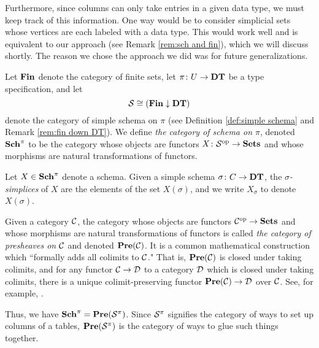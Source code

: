 \documentclass{amsart}
\def\DT{{\bf DT}}
\def\Sch{{\bf Sch}}
\def\Fin{{\bf Fin}}
\begin{document}
Furthermore, since columns can only take entries in a given data type, we must keep track of this information.  One way would be to consider simplicial sets whose vertices are each labeled with a data type.  This would work well and is equivalent to our approach (see Remark \ref{rem:sch and fin}), which we will discuss shortly.  The reason we chose the approach we did was for future generalizations.

\begin{definition}\label{def:schema}

Let $\Fin$ denote the category of finite sets, let $\pi\taking U\to\DT$ be a type specification, and let $$\mcS\iso(\Fin\down\DT)$$ denote the category of simple schema on $\pi$ (see Definition \ref{def:simple schema} and Remark \ref{rem:fin down DT}).  We define {\em the category of schema on $\pi$}, denoted $\Sch^\pi$ to be the category whose objects are functors $X\colon\mathcal{S}^\textnormal{op}\rightarrow{\bf Sets}$ and whose morphisms are natural transformations of functors.

Let $X\in\Sch^\pi$ denote a schema.  Given a simple schema $\sigma\taking C\to\DT$, the {\em $\sigma$-simplices} of $X$ are the elements of the set $X(\sigma)$, and we write $X_\sigma$ to denote $X(\sigma)$.

\end{definition}

\begin{remark}\label{rem:sch and fin}

Given a category $\mathcal{C}$, the category whose objects are functors $\mathcal{C}^\textnormal{op}\rightarrow{\bf Sets}$ and whose morphisms are natural transformations of functors is called {\em the category of presheaves on $\mathcal{C}$} and denoted ${\bf Pre}(\mathcal{C})$.  It is a common mathematical construction which ``formally adds all colimits to $\mathcal{C}$."  That is, ${\bf Pre}(\mathcal{C})$ is closed under taking colimits, and for any functor $\mathcal{C}\rightarrow\mathcal{D}$ to a category $\mathcal{D}$ which is closed under taking colimits, there is a unique colimit-preserving functor ${\bf Pre}(\mathcal{C})\rightarrow\mathcal{D}$ over $\mathcal{C}$.  See, for example, \cite[I.5.4]{MM}.

Thus, we have $\Sch^\pi=\Pre(\mcS^\pi)$.  Since $\mathcal{S}^\pi$ signifies the category of ways to set up columns of a tables, ${\bf Pre}(\mathcal{S}^\pi)$ is the category of ways to glue such things together.

\end{remark}
\end{document}
